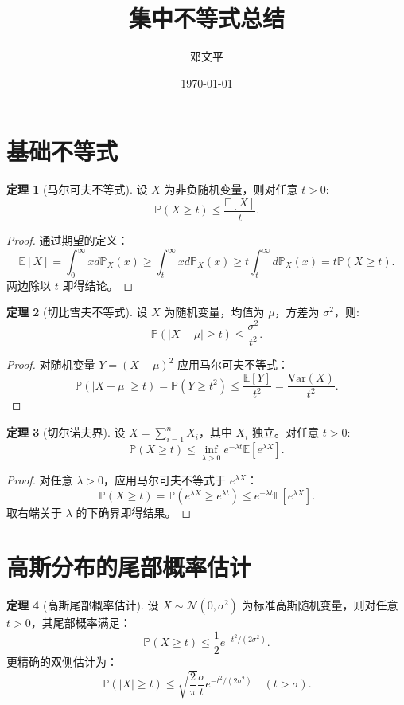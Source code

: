 \documentclass{article}
\title{集中不等式总结 }
\author{邓文平}
\date{\today}
\theoremstyle{definition}
\newtheorem{theorem}{定理}
\renewcommand{\P}{\mathbb{P}}
\newcommand{\E}{\mathbb{E}}
\newcommand{\Var}{\text{Var}}
\newcommand{\1}{\mathbf{1}}
\begin{document}
\maketitle

\section{基础不等式}

\begin{theorem}[马尔可夫不等式]
设 \( X \) 为非负随机变量，则对任意 \( t > 0 \):
\[
\P(X \geq t) \leq \frac{\E[X]}{t}.
\]
\end{theorem}

\begin{proof}
通过期望的定义：
\[
\E[X] = \int_0^\infty x d\P_X(x) \geq \int_t^\infty x d\P_X(x) \geq t\int_t^\infty d\P_X(x) = t\P(X \geq t).
\]
两边除以 \( t \) 即得结论。
\end{proof}

\begin{theorem}[切比雪夫不等式]
设 \( X \) 为随机变量，均值为 \( \mu \)，方差为 \( \sigma^2 \)，则:
\[
\P(|X - \mu| \geq t) \leq \frac{\sigma^2}{t^2}.
\]
\end{theorem}

\begin{proof}
对随机变量 \( Y = (X - \mu)^2 \) 应用马尔可夫不等式：
\[
\P(|X - \mu| \geq t) = \P(Y \geq t^2) \leq \frac{\E[Y]}{t^2} = \frac{\Var(X)}{t^2}.
\]
\end{proof}


\begin{theorem}[切尔诺夫界]
设 \( X = \sum_{i=1}^n X_i \)，其中 \( X_i \) 独立。对任意 \( t > 0 \):
\[
\P(X \geq t) \leq \inf_{\lambda > 0} e^{-\lambda t} \E\left[e^{\lambda X}\right].
\]
\end{theorem}

\begin{proof}
对任意 \( \lambda > 0 \)，应用马尔可夫不等式于 \( e^{\lambda X} \)：
\[
\P(X \geq t) = \P(e^{\lambda X} \geq e^{\lambda t}) \leq e^{-\lambda t}\E[e^{\lambda X}].
\]
取右端关于 \( \lambda \) 的下确界即得结果。
\end{proof}

\section{高斯分布的尾部概率估计}

\begin{theorem}[高斯尾部概率估计]
设 \( X \sim \mathcal{N}(0, \sigma^2) \) 为标准高斯随机变量，则对任意 \( t > 0 \)，其尾部概率满足：
\[
\P(X \geq t) \leq \frac{1}{2} e^{-t^2/(2\sigma^2)}.
\]
更精确的双侧估计为：
\[
\P(|X| \geq t) \leq \sqrt{\frac{2}{\pi}} \frac{\sigma}{t} e^{-t^2/(2\sigma^2)} \quad (t > \sigma).
\]
\end{theorem}
\end{document}

